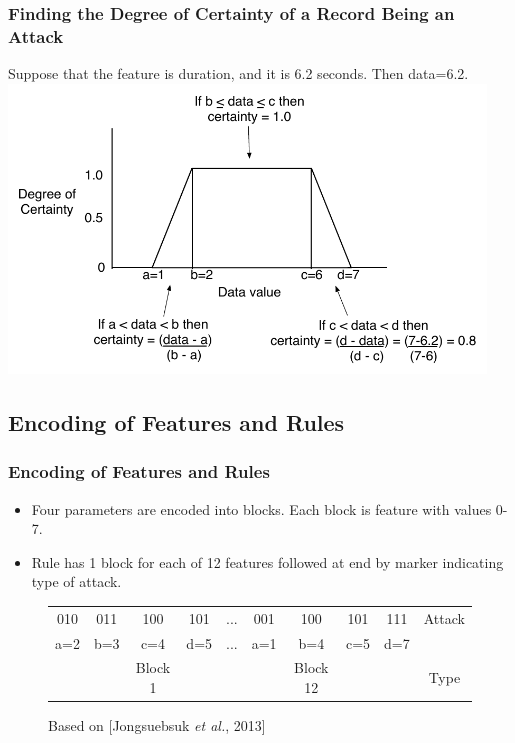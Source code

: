\documentclass{beamer}
\begin{document}
\begin{frame}
  \frametitle{Finding the Degree of Certainty of a Record Being an Attack}
	Suppose that the feature is duration, and it is 6.2 seconds. Then data=6.2.
  \includegraphics[width=0.95\textwidth]{../trapFigExample.pdf}
\end{frame}


\subsection{Encoding of Features and Rules}
\begin{frame}
	\frametitle{Encoding of Features and Rules}
	\begin{itemize}
	\item Four parameters are encoded into blocks. Each block is feature with values 0-7.
	\item Rule has 1 block for each of 12 features followed at end by marker indicating type of attack.
	\end{itemize}

\begin{figure}
\begin{small}
\begin{tabular}{|cccc|c|cccc|c|} \hline
010 & 011 & 100 & 101   & ... & 001 & 100 & 101 & 111   & Attack\\
a=2 & b=3 & c=4 & d=5   & ... & a=1 & b=4 & c=5 & d=7   &\\  
    &     & Block 1&    &        &     & Block 12& &       & Type\\
\hline\end{tabular}
\caption{Based on [Jongsuebsuk \emph{et al.}, 2013]}
\end{small}
\end{figure}
\end{frame}
\end{document}
